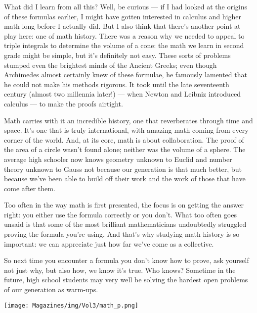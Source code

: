 \documentclass{article}
\begin{document}
\begin{multicols}{3}
What did I learn from all this? Well, be curious — if I had looked at the origins of these formulas earlier, I might have gotten interested in calculus and higher math long before I actually did. But I also think that there’s another point at play here: one of math history. There was a reason why we needed to appeal to triple integrals to determine the volume of a cone: the math we learn in second grade might be simple, but it’s definitely not easy. These sorts of problems stumped even the brightest minds of the Ancient Greeks; even though Archimedes almost certainly knew of these formulae, he famously lamented that he could not make his methods rigorous. It took until the late seventeenth century (almost two millennia later!) — when Newton and Leibniz introduced calculus — to make the proofs airtight. 

Math carries with it an incredible history, one that reverberates through time and space. It’s one that is truly international, with amazing math coming from every corner of the world. And, at its core, math is about collaboration. The proof of the area of a circle wasn’t found alone; neither was the volume of a sphere. The average high schooler now knows geometry unknown to Euclid and number theory unknown to Gauss not because our generation is that much better, but because we’ve been able to build off their work and the work of those that have come after them. 

Too often in the way math is first presented, the focus is on getting the answer right: you either use the formula correctly or you don’t. What too often goes unsaid is that some of the most brilliant mathematicians undoubtedly struggled proving the formula you’re using. And that’s why studying math history is so important: we can appreciate just how far we’ve come as a collective. 

So next time you encounter a formula you don’t know how to prove, ask yourself not just why, but also how, we know it’s true. Who knows? Sometime in the future, high school students may very well be solving the hardest open problems of our generation as warm-ups. 
\begin{center}
\texttt{[image: Magazines/img/Vol3/math\_p.png]}
\end{center}
\closearticle

\end{multicols}
\end{document}
